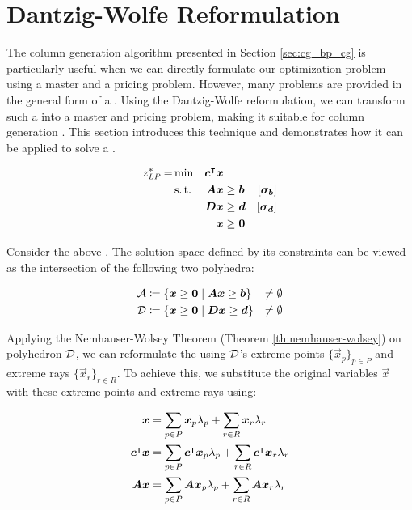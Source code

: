 \section{Dantzig-Wolfe Reformulation}\label{sec:cg_bp_dwr}
The column generation algorithm presented in Section \ref{sec:cg_bp_cg} is particularly useful when we can directly formulate our optimization problem using a master and a pricing problem. However, many problems are provided in the general form of a \LP{}. Using the Dantzig-Wolfe reformulation, we can transform such a \LP{} into a master and pricing problem, making it suitable for column generation \cite{thebook}. This section introduces this technique and demonstrates how it can be applied to solve a \LP{}.

\begin{equation}
\begin{aligned}
z^*_{\textit{LP}}{} = &\min & {\bm{c}}^\intercal {\bm{x}} & & & \\
&\operatorname{s.t.} & {\bm{A}} {\bm{x}} & \geq {\bm{b}} & \left[{\bm{\sigma}}_{\bm{b}}\right] & \\
&& {\bm{D}} {\bm{x}} & \geq {\bm{d}} & \left[{\bm{\sigma}}_{\bm{d}}\right] & \\
&& {\bm{x}} & \geq {\bm{0}}
\end{aligned}
\end{equation}

Consider the above \LP{}. The solution space defined by its constraints can be viewed as the intersection of the following two polyhedra:

\begin{equation}
\begin{aligned}
\mathcal{A} &\coloneqq \left\{ {\bm{x}} \geq {\bm{0}} \mid {\bm{A}} {\bm{x}} \geq {\bm{b}} \right\} &\neq \emptyset \\
\mathcal{D} &\coloneqq \left\{ {\bm{x}} \geq {\bm{0}} \mid {\bm{D}} {\bm{x}} \geq {\bm{d}} \right\} &\neq \emptyset
\end{aligned}
\end{equation}

Applying the Nemhauser-Wolsey Theorem (Theorem \ref{th:nemhauser-wolsey}) on polyhedron $\mathcal{D}$, we can reformulate the \LP{} using $\mathcal{D}$'s extreme points $\{\vec{x}_p\}_{p \in P}$ and extreme rays $\{\vec{x}_r\}_{r \in R}$. To achieve this, we substitute the original variables $\vec{x}$ with these extreme points and extreme rays using:

\begin{equation}
\begin{aligned}
{\bm{x}} &= \sum_{p \in P} {\bm{x}}_p \lambda_p + \sum_{r \in R} {\bm{x}}_r \lambda_r \\
{\bm{c}}^\intercal {\bm{x}} &= \sum_{p \in P} {\bm{c}}^\intercal {\bm{x}}_p \lambda_p + \sum_{r \in R} {\bm{c}}^\intercal {\bm{x}}_r \lambda_r \\
{\bm{A}} {\bm{x}} &= \sum_{p \in P} {\bm{A}} {\bm{x}}_p \lambda_p + \sum_{r \in R} {\bm{A}} {\bm{x}}_r \lambda_r
\end{aligned}
\end{equation}

